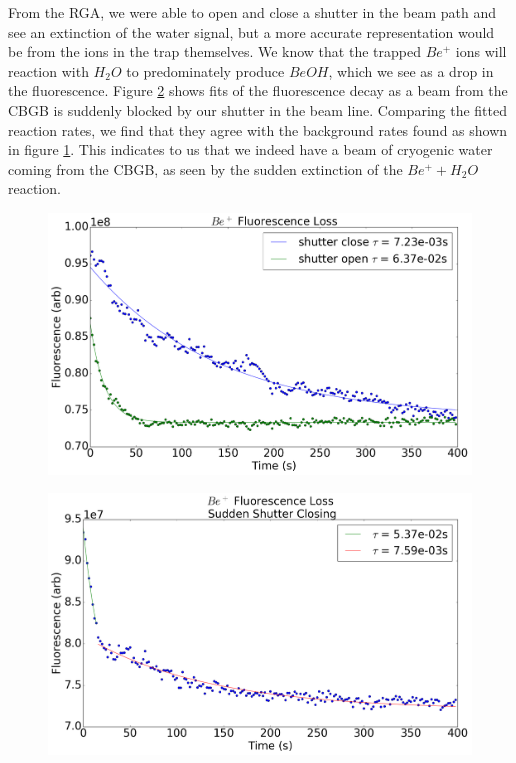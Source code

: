 \documentclass[a4paper]{article}
\begin{document}
From the RGA, we were able to open and close a shutter in the beam path and see an extinction of the water signal, but a more accurate representation would be from the ions in the trap themselves. We know that the trapped $Be^+$ ions will reaction with $H_2O$ to predominately produce $BeOH$, which we see as a drop in the fluorescence. Figure \ref{f: shutter_closing} shows fits of the fluorescence decay as a beam from the CBGB is suddenly blocked by our shutter in the beam line. Comparing the fitted reaction rates, we find that they agree with the background rates found as shown in figure \ref{f: shutter_bkg}. This indicates to us that we indeed have a beam of cryogenic water coming from the CBGB, as seen by the sudden extinction of the $Be^+ + H_2O$ reaction.

\begin{figure}[H] \label{f: shutter_bkg}
\centering
\includegraphics[width=1\textwidth]{CBGB_sudden_shutter_flow_bkg.png}
\caption{}
\end{figure}

\begin{figure}[H] \label{f: shutter_closing}
\centering
\includegraphics[width=1\textwidth]{CBGB_sudden_shutter_flow.png}
\caption{}
\end{figure}
\end{document}
